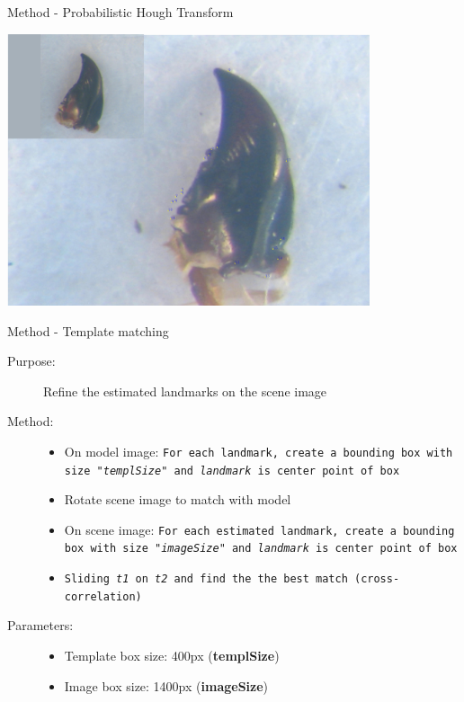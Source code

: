 \documentclass{beamer}
\begin{document}
\begin{frame}{Method - Probabilistic Hough Transform}
	\begin{center}
		\includegraphics[height=8cm]{images/pht19.JPG}	
	\end{center}
\end{frame}
\begin{frame}{Method - Template matching}
	\begin{description}
		\item [Purpose:] Refine the estimated landmarks on the scene image 
		\item [Method:] 
			\begin{itemize}
				\item On model image: \texttt{For each landmark, create a bounding box with size "\textit{templSize}" and \textit{landmark} is center point of box}
				\item Rotate scene image to match with model
				\item On scene image: \texttt{For each estimated landmark, create a bounding box with size "\textit{imageSize}" and \textit{landmark} is center point of box}
				\item \texttt{Sliding \textit{t1} on \textit{t2} and find the the best match (cross-correlation)}
			\end{itemize}
		\item [Parameters:]
			\begin{itemize}
				\item Template box size: 400px (\textbf{templSize})
				\item Image box size: 1400px (\textbf{imageSize})
			\end{itemize}
	\end{description}
\end{frame}
\end{document}

